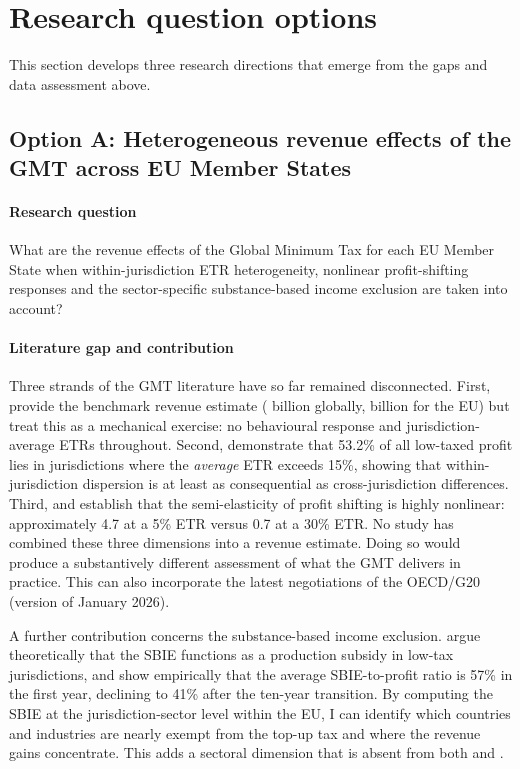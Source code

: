\documentclass[11pt,a4paper]{article}
\newcommand{\EUR}{\texteuro}
\begin{document}
\section{Research question options}\label{sec:questions}

This section develops three research directions that emerge from the gaps and data assessment above. 

\subsection{Option A: Heterogeneous revenue effects of the GMT across EU Member States}\label{sec:optionA}

\paragraph{Research question} What are the revenue effects of the Global Minimum Tax for each EU Member State when within-jurisdiction ETR heterogeneity, nonlinear profit-shifting responses and the sector-specific substance-based income exclusion are taken into account?

\paragraph{Literature gap and contribution} Three strands of the GMT literature have so far remained disconnected. First, \citet{barake2022} provide the benchmark revenue estimate (\EUR 179 billion globally, \EUR 55 billion for the EU) but treat this as a mechanical exercise: no behavioural response and jurisdiction-average ETRs throughout. Second, \citet{hugger2025} demonstrate that 53.2\% of all low-taxed profit lies in jurisdictions where the \textit{average} ETR exceeds 15\%, showing that within-jurisdiction dispersion is at least as consequential as cross-jurisdiction differences. Third, \citet{dowd2017} and \citet{garcia2024} establish that the semi-elasticity of profit shifting is highly nonlinear: approximately 4.7 at a 5\% ETR versus 0.7 at a 30\% ETR. No study has combined these three dimensions into a revenue estimate. Doing so would produce a substantively different assessment of what the GMT delivers in practice. This can also incorporate the latest negotiations of the OECD/G20 (version of January 2026). 

A further contribution concerns the substance-based income exclusion. \citet{schjelderup2024} argue theoretically that the SBIE functions as a production subsidy in low-tax jurisdictions, and \citet{devereux2023} show empirically that the average SBIE-to-profit ratio is 57\% in the first year, declining to 41\% after the ten-year transition. By computing the SBIE at the jurisdiction-sector level within the EU, I can identify which countries and industries are nearly exempt from the top-up tax and where the revenue gains concentrate. This adds a sectoral dimension that is absent from both \citeauthor{barake2022} and \citeauthor{hugger2025}.
\end{document}
